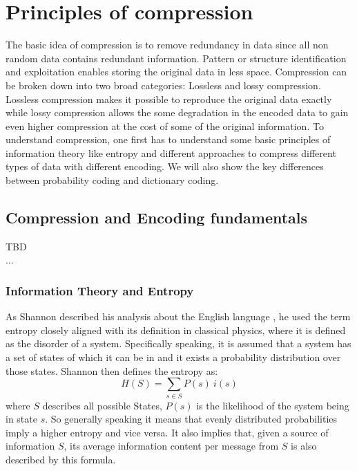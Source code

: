 
\chapter{Principles of compression}
\label{ch:Principles of compression}
\par{
The basic idea of compression is to remove redundancy in data since all non random data contains redundant information. Pattern or structure identification and exploitation enables storing the original data in less space. Compression can be broken down into two broad categories: Lossless and lossy compression. Lossless compression makes it possible to reproduce the original data exactly while lossy compression allows the some degradation in the encoded data to gain even higher compression at the cost of some of the original information. To understand compression, one first has to understand some basic principles of information theory like entropy and different approaches to compress different types of data with different encoding. We will also show the key differences between probability coding and dictionary coding.}

\section{Compression and Encoding fundamentals}
\label{ch:Principles of compression:sec:Compression}
TBD\\
...

\subsection{Information Theory and Entropy}
\par{
As Shannon described his analysis about the English language \cite{entropy}, he used the term entropy closely aligned with its definition in classical physics, where it is defined as the disorder of a system. Specifically speaking, it is assumed that a system has a set of states of which it can be in and it exists a probability distribution over those states. Shannon then defines the entropy as:
\[
H(S) = \sum_{s \in S} P(s) \: i(s)
\]
where $S$ describes all possible States, $P(s)$ is the likelihood of the system being in state $s$. So generally speaking it means that evenly distributed probabilities imply a higher entropy and vice versa.
It also implies that, given a source of information $S$, its average information content per message from $S$ is also described by this formula.}

